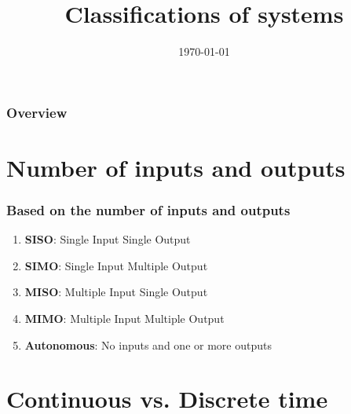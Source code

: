 \documentclass{beamer}
\title[Classifications of systems]{Classifications of systems} %
\author{} %
\institute[KU Leuven] %
{
Katholieke Universiteit Leuven \\ %
\medskip
\textit{} %
}
\date{\today} %
\begin{document}
\begin{frame}
\titlepage %
\end{frame}

\begin{frame}
\frametitle{Overview} %
\tableofcontents %
\end{frame}


\section{Number of inputs and outputs} 

\begin{frame}
\frametitle{Based on the number of inputs and outputs}
\begin{enumerate}
\item \textbf{SISO}: Single Input Single Output
\item \textbf{SIMO}: Single Input Multiple Output
\item \textbf{MISO}: Multiple Input Single Output
\item \textbf{MIMO}: Multiple Input Multiple Output
\item \textbf{Autonomous}: No inputs and one or more outputs
\end{enumerate}
\end{frame}

\section{Continuous vs. Discrete time} 
\end{document}

